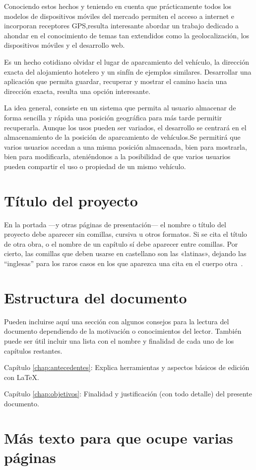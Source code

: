
Conociendo estos hechos y teniendo en cuenta que prácticamente todos los modelos de dispositivos móviles del mercado permiten el acceso a internet e incorporan receptores GPS,resulta interesante abordar un trabajo dedicado a ahondar en el conocimiento de temas tan extendidos como la geolocalización, los dispositivos móviles y el desarrollo web.

Es un hecho cotidiano olvidar el lugar de aparcamiento del vehículo, la dirección exacta del alojamiento hotelero y un sinfín de ejemplos similares. Desarrollar una aplicación que permita guardar, recuperar y mostrar el camino hacia una dirección exacta, resulta una opción interesante.

La idea general, consiste en un sistema que permita al usuario almacenar de forma sencilla y rápida una posición geográfica para más tarde permitir recuperarla. Aunque los usos pueden ser variados, el desarrollo se centrará en el almacenamiento de la posición de aparcamiento de vehículos.Se permitirá que varios usuarios accedan a una misma posición almacenada, bien para mostrarla, bien para modificarla, ateniéndonos a la posibilidad de que varios usuarios pueden compartir el uso o propiedad de un mismo vehículo.




\section{Título del proyecto}

En la portada ---y otras páginas de presentación--- el nombre o título del
proyecto debe aparecer sin comillas, cursiva u otros formatos. Si se cita el
título de otra obra, o el nombre de un capítulo sí debe aparecer entre
comillas. Por cierto, las comillas que deben usarse en castellano son las
«latinas», dejando las ``inglesas'' para los raros casos en los que aparezca una
cita en el cuerpo otra~\cite{sousa}.


\section{Estructura del documento}

Pueden incluirse aquí una sección con algunos consejos para la lectura del
documento dependiendo de la motivación o conocimientos del lector.  También
puede ser útil incluir una lista con el nombre y finalidad de cada uno de los
capítulos restantes.

\begin{definitionlist}
\item[Capítulo \ref{chap:antecedentes}: \nameref{chap:antecedentes}] Explica herramientas
  y aspectos básicos de edición con \LaTeX.
\item[Capítulo \ref{chap:objetivos}: \nameref{chap:objetivos}] Finalidad y justificación
  (con todo detalle) del presente documento.
\end{definitionlist}


\section{Más texto para que ocupe varias páginas}

\blindtext
\blinditemize[4]
\blindmathpaper


